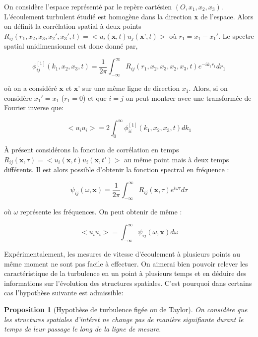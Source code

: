 \documentclass[12pt]{article}
\theoremstyle{plain}
\newtheorem{proposition}[theorem]{Proposition}
\theoremstyle{remark}
\begin{document}
		On considère l'espace représenté par le repère cartésien $(O,x_1,x_2,x_3)$. L'écoulement turbulent étudié est homogène dans la direction \textbf{x} de l'espace. Alors on définit la corrélation spatial à deux points \\$R_{ij}(r_1, x_2,x_3,x_2',x_3',t) = <u_i(\textbf{x},t)u_j(\textbf{x'},t)>$ où $r_1=x_1-x_1'$. Le spectre spatial unidimensionnel est donc donné par,
		
		\begin{equation}
			\phi_{ij}^{[1]}(k_1,x_2,x_3,t)=\frac{1}{2\pi}\int_{-\infty}^{\infty}R_{ij}(r_1,x_2,x_3,x_2,x_3,t)e^{-ik_1r_1}dr_1
		\end{equation}
	
		où on a considéré $\textbf{x}$ et $\textbf{x'}$ sur une même ligne de direction $x_1$. Alors, si on considère $x_1'=x_1$ ($r_1=0$) et que $i=j$ on peut montrer avec une transformée de Fourier inverse que:
		
		\begin{equation}
			<u_iu_i>=2\int_{0}^{\infty}\phi_{ii}^{[1]}(k_1,x_2,x_3,t)dk_1
		\end{equation}
	
		À présent considérons la fonction de corrélation en temps $R_{ij}(\textbf{x},\tau)=<u_i(\textbf{x},t)u_i(\textbf{x},t')>$ au même point mais à deux temps différents. Il est alors possible d'obtenir la fonction spectral en fréquence :
		
		\begin{equation}
			\psi_{ij}(\omega,\textbf{x})=\frac{1}{2\pi}\int_{-\infty}^{\infty}R_{ij}(\textbf{x},\tau)e^{i\omega\tau}d\tau
		\end{equation}
	
		où $\omega$ représente les fréquences. On peut obtenir de même : 
		
		\begin{equation}
			<u_iu_i>=\int_{-\infty}^{\infty}\psi_{ij}(\omega,\textbf{x})d\omega
		\end{equation}
		
		
		Expérimentalement, les mesures de vitesse d'écoulement à plusieurs points au même moment ne sont pas facile à effectuer. On aimerai bien pouvoir relever les caractéristique de la turbulence en un point à plusieurs temps et en déduire des informations sur l'évolution des structures spatiales. C'est pourquoi dans certains cas l'hypothèse suivante est admissible:
		
		\begin{proposition}[Hypothèse de turbulence figée ou de Taylor]
			On considère que les structures spatiales d'intéret ne change pas de manière signifiante durant le temps de leur passage le long de la ligne de mesure. 
			\label{prop:turb-fig}
		\end{proposition}
	
\end{document}

